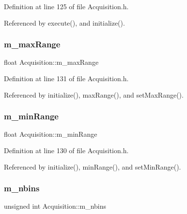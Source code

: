 Definition at line 125 of file Acquisition.\+h.



Referenced by execute(), and initialize().

\mbox{\label{classAcquisition_a45478629e9db582470b4b158edb46616}} 
\subsubsection{\texorpdfstring{m\+\_\+max\+Range}{m\_maxRange}}
{\footnotesize\ttfamily float Acquisition\+::m\+\_\+max\+Range\hspace{0.3cm}{\ttfamily [private]}}



Definition at line 131 of file Acquisition.\+h.



Referenced by initialize(), max\+Range(), and set\+Max\+Range().

\mbox{\label{classAcquisition_a06b3ea027ebdcb15f64a6517ceb99b76}} 
\subsubsection{\texorpdfstring{m\+\_\+min\+Range}{m\_minRange}}
{\footnotesize\ttfamily float Acquisition\+::m\+\_\+min\+Range\hspace{0.3cm}{\ttfamily [private]}}



Definition at line 130 of file Acquisition.\+h.



Referenced by initialize(), min\+Range(), and set\+Min\+Range().

\mbox{\label{classAcquisition_a05bccdc4b9ada37beaeba8794ccef12d}} 
\subsubsection{\texorpdfstring{m\+\_\+nbins}{m\_nbins}}
{\footnotesize\ttfamily unsigned int Acquisition\+::m\+\_\+nbins\hspace{0.3cm}{\ttfamily [private]}}



